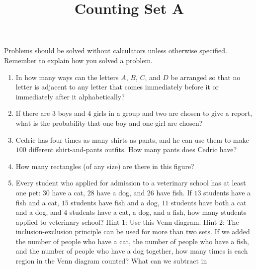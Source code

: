 \documentclass{article}
\title{Counting Set A}
\date{}
\author{}
\begin{document}
\maketitle
\noindent Problems should be solved without calculators unless otherwise 
specified. Remember to explain how you solved a problem.
\begin{enumerate}
    \item In how many ways can the letters $A$, $B$, $C$, and $D$ be 
        arranged so that no letter is adjacent to any letter that comes 
        immediately before it or immediately after it alphabetically?
        \vspace{3cm}
    \item If there are $3$ boys and $4$ girls in a group and two are chosen 
        to give a report, what is the probability that one boy and one girl 
        are chosen?
        \vspace{3cm}
    \item Cedric has four times as many shirts as pants, and he can use them to 
        make $100$ different shirt-and-pants outfits. How many pants does Cedric 
        have?
        \vspace{3cm}
    \item How many rectangles (of any size) are there in this figure?
        \begin{center}
        \end{center}
        \vspace{3cm}
    \item Every student who applied for admission to a veterinary school has 
        at least one pet: $30$ have a cat, $28$ have a dog, and $26$ have 
        fish. If $13$ students have a fish and a cat, $15$ students have 
        fish and a dog, $11$ students have both a cat and a dog, and $4$ 
        students have a cat, a dog, and a fish, how many students applied to 
        veterinary school? Hint 1: Use this Venn diagram. Hint 2: The 
        inclusion-exclusion principle can be used for more than two sets. If we 
        added the number of people who have a cat, the number of people who have 
        a fish, and the number of people who have a dog together, how many times 
        is each region in the Venn diagram counted? What can we subtract in 

\end{enumerate}
\end{document}
